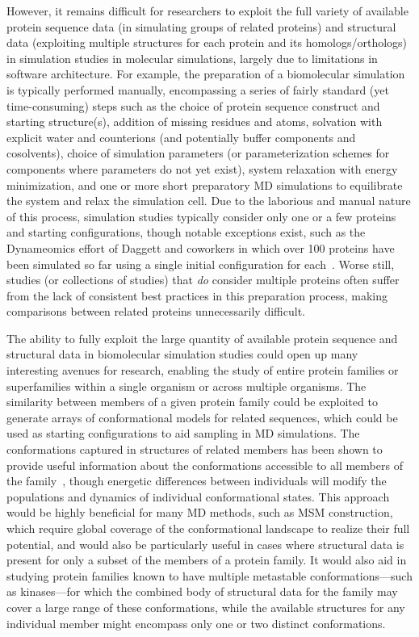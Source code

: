 \documentclass[aps,pre,twocolumn,nofootinbib,superscriptaddress,linenumbers]{revtex4-1}
\begin{document}
\color{red}
However, it remains difficult for researchers to exploit the full variety of available protein sequence data (in simulating groups of related proteins) and structural data (exploiting multiple structures for each protein and its homologs/orthologs) in simulation studies in molecular simulations, largely due to limitations in software architecture.
For example, the preparation of a biomolecular simulation is typically performed manually, encompassing a series of fairly standard (yet time-consuming) steps such as the choice of protein sequence construct and starting structure(s), addition of missing residues and atoms, solvation with explicit water and counterions (and potentially buffer components and cosolvents), choice of simulation parameters (or parameterization schemes for components where parameters do not yet exist),  system relaxation with energy minimization, and one or more short preparatory MD simulations to equilibrate the system and relax the simulation cell.
Due to the laborious and manual nature of this process, simulation studies typically consider only one or a few proteins and starting configurations,  though notable exceptions exist, such as the Dynameomics effort of Daggett and coworkers in which over 100 proteins have been simulated so far using a single initial configuration for each~\cite{daggett:structure:2010:dynameomics}.
Worse still, studies (or collections of studies) that \emph{do} consider multiple proteins often suffer from the lack of consistent best practices in this preparation process, making comparisons between related proteins unnecessarily difficult.

The ability to fully exploit the large quantity of available protein sequence and structural data in biomolecular simulation studies could open up many interesting avenues for research, enabling the study of entire protein families or superfamilies within a single organism or across multiple organisms.
The similarity between members of a given protein family could be exploited to generate arrays of conformational models for related sequences, which could be used as starting configurations to aid sampling in MD simulations.
The conformations captured in structures of related members has been shown to provide useful information about the conformations accessible to all members of the family~\cite{friedland:plos-comput-biol:2009:conformational-dynamics,sali:2012:allostery-modeling}, though energetic differences between individuals will modify the populations and dynamics of individual conformational states.
This approach would be highly beneficial for many MD methods, such as MSM construction, which require global coverage of the conformational landscape to realize their full potential, and would also be particularly useful in cases where structural data is present for only a subset of the members of a protein family.
It would also aid in studying protein families known to have multiple metastable conformations---such as kinases---for which the combined body of structural data for the family may cover a large range of these conformations, while the available structures for any individual member might encompass only one or two distinct conformations.
\color{black}
\end{document}
